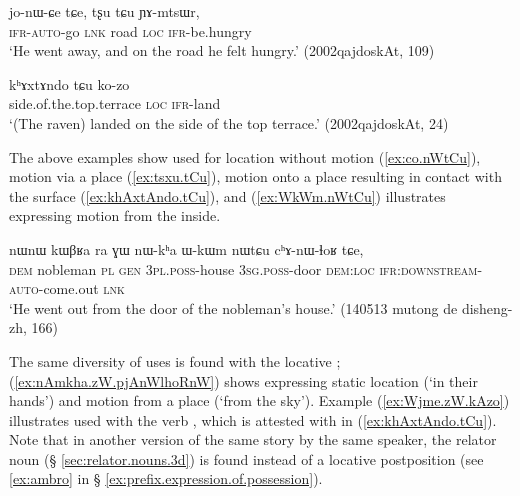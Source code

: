 \begin{exe}
\ex \label{ex:tsxu.tCu}
\gll jo-nɯ-ɕe tɕe, tʂu tɕu ɲɤ-mtsɯr, \\
\textsc{ifr}-\textsc{auto}-go \textsc{lnk} road \textsc{loc} \textsc{ifr}-be.hungry \\
\glt `He went away, and on the road he felt hungry.' (2002qajdoskAt, 109)
\end{exe}

\begin{exe}
\ex \label{ex:khAxtAndo.tCu}
\gll  kʰɤxtɤndo tɕu ko-zo \\
side.of.the.top.terrace \textsc{loc} \textsc{ifr}-land \\
\glt `(The raven) landed on the side of the top terrace.' (2002qajdoskAt, 24)
\end{exe}

The above examples show  used for location without motion (\ref{ex:co.nWtCu}), motion via a place (\ref{ex:tsxu.tCu}), motion onto a place resulting in contact with the surface (\ref{ex:khAxtAndo.tCu}), and (\ref{ex:WkWm.nWtCu}) illustrates  expressing motion from the inside.

\begin{exe}
\ex \label{ex:WkWm.nWtCu}
\gll nɯnɯ kɯβʁa ra ɣɯ nɯ-kʰa ɯ-kɯm nɯtɕu cʰɤ-nɯ-ɬoʁ tɕe, \\
\textsc{dem} nobleman \textsc{pl} \textsc{gen} \textsc{3pl}.\textsc{poss}-house \textsc{3sg}.\textsc{poss}-door \textsc{dem}:\textsc{loc} \textsc{ifr}:\textsc{downstream}-\textsc{auto}-come.out \textsc{lnk} \\
\glt  `He went out from the door of the nobleman's house.' (140513 mutong de disheng-zh, 166)
\end{exe}

The same diversity of uses is found with the locative ; (\ref{ex:nAmkha.zW.pjAnWlhoRnW}) shows  expressing static location (`in their hands') and motion from a place (`from the sky').  Example (\ref{ex:Wjme.zW.kAzo}) illustrates  used with the verb , which is attested with  in (\ref{ex:khAxtAndo.tCu}). Note that in another version of the same story by the same speaker, the relator noun  (§ \ref{sec:relator.nouns.3d}) is found instead of a locative postposition (see \ref{ex:ambro} in § \ref{ex:prefix.expression.of.possession}).

